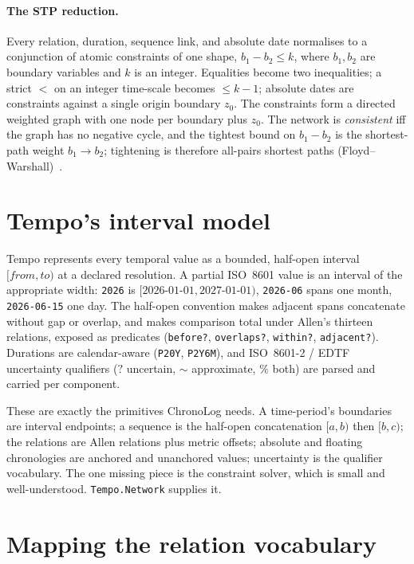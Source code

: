 \documentclass[a4paper,USenglish,cleveref,autoref,thm-restate]{oasics-v2021}
\begin{document}
\paragraph{The STP reduction.} Every relation, duration, sequence link,
and absolute date normalises to a conjunction of atomic constraints of
one shape, $b_1 - b_2 \leq k$, where $b_1, b_2$ are boundary variables
and $k$ is an integer. Equalities become two inequalities; a strict $<$
on an integer time-scale becomes $\leq k-1$; absolute dates are
constraints against a single origin boundary $z_0$. The constraints form
a directed weighted graph with one node per boundary plus $z_0$. The
network is \emph{consistent} iff the graph has no negative cycle, and the
tightest bound on $b_1 - b_2$ is the shortest-path weight $b_1 \to b_2$;
tightening is therefore all-pairs shortest paths
(Floyd--Warshall)~\cite{dechter1991,floyd1962}.

\section{Tempo's interval model}
\label{sec:tempo}

Tempo represents every temporal value as a bounded, half-open interval
$[\textit{from}, \textit{to})$ at a declared resolution. A partial
ISO~8601 value is an interval of the appropriate width: \texttt{2026} is
$[2026\text{-}01\text{-}01, 2027\text{-}01\text{-}01)$, \texttt{2026-06}
spans one month, \texttt{2026-06-15} one day. The half-open convention
makes adjacent spans concatenate without gap or overlap, and makes
comparison total under Allen's thirteen relations, exposed as predicates
(\texttt{before?}, \texttt{overlaps?}, \texttt{within?},
\texttt{adjacent?}). Durations are calendar-aware
(\texttt{P20Y}, \texttt{P2Y6M}), and ISO~8601-2 / EDTF uncertainty
qualifiers ($?$ uncertain, $\sim$ approximate, $\%$ both) are parsed and
carried per component.

These are exactly the primitives ChronoLog needs. A time-period's
boundaries are interval endpoints; a sequence is the half-open
concatenation $[a,b)$ then $[b,c)$; the relations are Allen relations
plus metric offsets; absolute and floating chronologies are anchored and
unanchored values; uncertainty is the qualifier vocabulary. The one
missing piece is the constraint solver, which is small and
well-understood. \texttt{Tempo.Network} supplies it.

\section{Mapping the relation vocabulary}
\label{sec:mapping}
\end{document}
